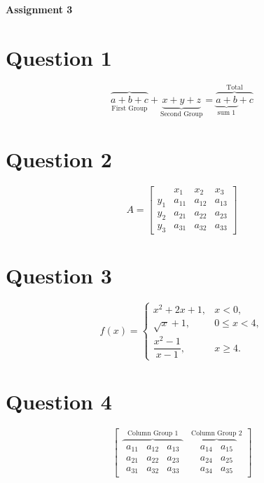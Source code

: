 \documentclass{article}
\begin{document}
\begin{center}
\Large\textbf{Assignment 3}
\end{center}

\section{Question 1}
\[
\overbrace{a+b+c}_{\text{First Group}}+
\underbrace{x+y+z}_{\text{Second Group}}
=
\overbrace{\underbrace{a+b}_{\text{sum 1}}+c}^{\text{Total}}
\]
\vspace{1cm}
\section{Question 2}
\[
A=
\left[
\begin{array}{c|ccc}
& x_1 & x_2 & x_3 \\ \hline
y_1 & a_{11} & a_{12} & a_{13} \\
y_2 & a_{21} & a_{22} & a_{23} \\
y_3 & a_{31} & a_{32} & a_{33}
\end{array}
\right]
\]
\vspace{1cm}
\section{Question 3}
\[
f(x)=
\begin{cases}
x^2+2x+1, & x<0, \\
\sqrt{x}+1, &0\leq x<4 ,\\
\dfrac{x^2 -1}{x-1}, & x\geq4.
\end{cases}
\]
\vspace{1cm}
\section{Question 4}

\[
\begin{bmatrix}
\overbrace{
\begin{matrix}
a_{11} & a_{12} & a_{13} \\
a_{21} & a_{22} & a_{23} \\
a_{31} & a_{32} & a_{33}
\end{matrix}
}^{\text{Column Group 1}}
&
\overbrace{
\begin{matrix}
a_{14} & a_{15} \\
a_{24} & a_{25}\\
a_{34} & a_{35}
\end{matrix}
}^{\text{Column Group 2}}
\end{bmatrix}
\]
\vspace{10cm}
\end{document}
